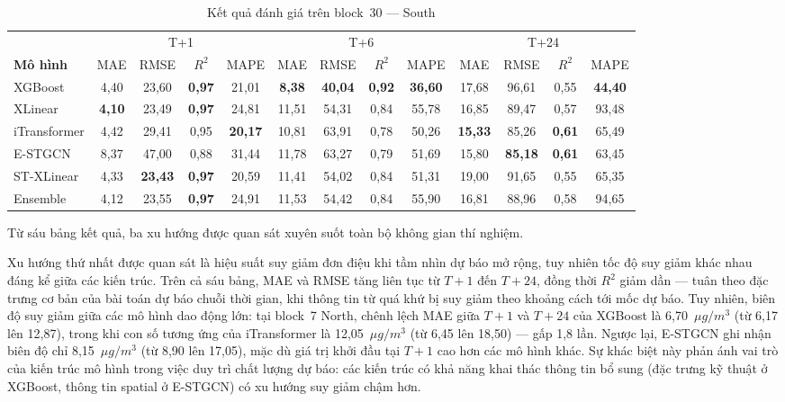 \begin{table}[H]
\centering
\caption{Kết quả đánh giá trên block~30 --- South}
\label{tab:block30_south}
\small
\begin{tabular}{l|cccc|cccc|cccc}
\toprule
 & \multicolumn{4}{c|}{T+1} & \multicolumn{4}{c|}{T+6} & \multicolumn{4}{c}{T+24} \\
\textbf{Mô hình} & MAE & RMSE & $R^2$ & MAPE & MAE & RMSE & $R^2$ & MAPE & MAE & RMSE & $R^2$ & MAPE \\
\midrule
XGBoost     & 4,40 & 23,60 & \textbf{0,97} & 21,01 & \textbf{8,38} & \textbf{40,04} & \textbf{0,92} & \textbf{36,60} & 17,68 & 96,61 & 0,55 & \textbf{44,40} \\
XLinear     & \textbf{4,10} & 23,49 & \textbf{0,97} & 24,81 & 11,51 & 54,31 & 0,84 & 55,78 & 16,85 & 89,47 & 0,57 & 93,48 \\
iTransformer & 4,42 & 29,41 & 0,95 & \textbf{20,17} & 10,81 & 63,91 & 0,78 & 50,26 & \textbf{15,33} & 85,26 & \textbf{0,61} & 65,49 \\
E-STGCN     & 8,37 & 47,00 & 0,88 & 31,44 & 11,78 & 63,27 & 0,79 & 51,69 & 15,80 & \textbf{85,18} & \textbf{0,61} & 63,45 \\
ST-XLinear  & 4,33 & \textbf{23,43} & \textbf{0,97} & 20,59 & 11,41 & 54,02 & 0,84 & 51,31 & 19,00 & 91,65 & 0,55 & 65,35 \\
Ensemble    & 4,12 & 23,55 & \textbf{0,97} & 24,91 & 11,53 & 54,42 & 0,84 & 55,90 & 16,81 & 88,96 & 0,58 & 94,65 \\
\bottomrule
\end{tabular}
\end{table}

Từ sáu bảng kết quả, ba xu hướng được quan sát xuyên suốt toàn bộ không gian thí nghiệm.

Xu hướng thứ nhất được quan sát là hiệu suất suy giảm đơn điệu khi tầm nhìn dự báo mở rộng, tuy nhiên tốc độ suy giảm khác nhau đáng kể giữa các kiến trúc. Trên cả sáu bảng, MAE và RMSE tăng liên tục từ $T{+}1$ đến $T{+}24$, đồng thời $R^2$ giảm dần --- tuân theo đặc trưng cơ bản của bài toán dự báo chuỗi thời gian, khi thông tin từ quá khứ bị suy giảm theo khoảng cách tới mốc dự báo. Tuy nhiên, biên độ suy giảm giữa các mô hình dao động lớn: tại block~7 North, chênh lệch MAE giữa $T{+}1$ và $T{+}24$ của XGBoost là 6,70~$\mu g/m^3$ (từ 6,17 lên 12,87), trong khi con số tương ứng của iTransformer là 12,05~$\mu g/m^3$ (từ 6,45 lên 18,50) --- gấp 1,8 lần. Ngược lại, E-STGCN ghi nhận biên độ chỉ 8,15~$\mu g/m^3$ (từ 8,90 lên 17,05), mặc dù giá trị khởi đầu tại $T{+}1$ cao hơn các mô hình khác. Sự khác biệt này phản ánh vai trò của kiến trúc mô hình trong việc duy trì chất lượng dự báo: các kiến trúc có khả năng khai thác thông tin bổ sung (đặc trưng kỹ thuật ở XGBoost, thông tin spatial ở E-STGCN) có xu hướng suy giảm chậm hơn.

